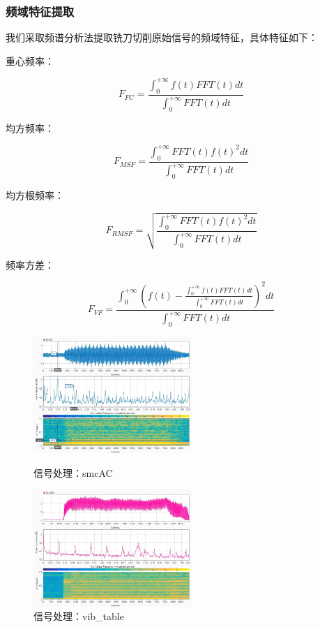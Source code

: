 \subsubsection{频域特征提取}
我们采取频谱分析法提取铣刀切削原始信号的频域特征，具体特征如下：\par
重心频率：\par
$$ F_{FC}=\frac{\int_{0}^{+\infty}f(t)FFT(t)dt}{\int_{0}^{+\infty} FFT(t)dt} $$\par
均方频率：\par
$$ F_{MSF}=\frac{\int_{0}^{+\infty} FFT(t)f(t)^{2}dt}{\int_{0}^{+\infty}FFT(t)dt} $$\par
均方根频率：\par
$$ F_{RMSF}=\sqrt{\frac{\int_{0}^{+\infty}FFT(t)f(t)^{2}dt}{\int_{0}^{+\infty}FFT(t)dt}} $$ \par
\newpage
频率方差： \par
$$ F_{VF}=\frac{\int_{0}^{+\infty}(f(t)-\frac{\int_{0}^{+\infty}f(t)FFT(t)dt}{\int_{0}^{+\infty}FFT(t)dt} )^{2}dt}{\int_{0}^{+\infty}FFT(t)dt}  $$ \par
% 
% 
% 
% 
\begin{figure}[htbp]
\begin{minipage}[t]{0.48\textwidth}
\centering
\includegraphics[width=6cm]{Chapter2/smcAC.jpg}
\caption{信号处理：smcAC}
\end{minipage}
\begin{minipage}[t]{0.48\textwidth}
\centering
\includegraphics[width=6cm]{Chapter2/vib_table.jpg}
  \caption{信号处理：vib\_table}
\end{minipage}
\end{figure}

